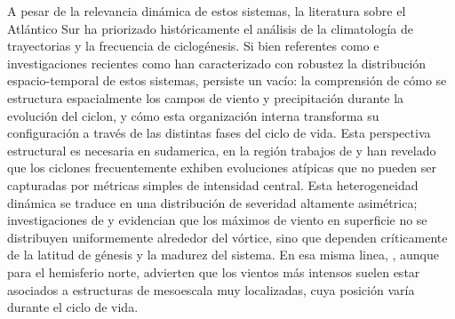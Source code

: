 A pesar de la relevancia dinámica de estos sistemas, la literatura sobre el Atlántico Sur ha priorizado históricamente el análisis de la climatología de trayectorias y la frecuencia de ciclogénesis. Si bien referentes como \citet{gramcianinov2020analysis} e investigaciones recientes como \citet{padilhareinke2026characterization} han caracterizado con robustez la distribución espacio-temporal de estos sistemas, persiste un vacío: la comprensión de cómo se estructura espacialmente los campos de viento y precipitación durante la evolución del ciclon, y cómo esta organización interna transforma su configuración a través de las distintas fases del ciclo de vida.
%
Esta perspectiva estructural es necesaria en sudamerica, en la región trabajos de \citet{gozzo2013air} y \citet{reboita2022from} han revelado que los ciclones frecuentemente exhiben evoluciones atípicas que no pueden ser capturadas por métricas simples de intensidad central.
Esta heterogeneidad dinámica se traduce en una distribución de severidad altamente asimétrica; investigaciones de \citet{bitencourt2010relating} y \citet{cardoso2022synoptic} evidencian que los máximos de viento en superficie no se distribuyen uniformemente alrededor del vórtice, sino que dependen críticamente de la latitud de génesis y la madurez del sistema.
%
En esa misma linea, \citet{eisenstein2023identification}, aunque para el hemisferio norte, advierten que los vientos más intensos suelen estar asociados a estructuras de mesoescala muy localizadas, cuya posición varía durante el ciclo de vida.
